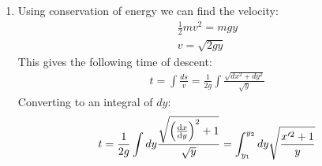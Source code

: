 \documentclass[12pt]{article}
\title{}
\author{Johannes Byle}
\begin{document}
    \maketitle
    \begin{enumerate}
        \item Using conservation of energy we can find the velocity:
        \begin{gather*}
            \frac{1}{2}mv^2=mgy\\
            v=\sqrt{2gy}
        \end{gather*}
        This gives the following time of descent:
        \begin{gather*}
            t=\int \frac{ds}{v}=\frac{1}{2g}\int \frac{\sqrt{dx^2+dy^2}}{\sqrt{y}}
        \end{gather*}
        Converting to an integral of $dy$:
        \begin{gather*}
            t=\frac{1}{2g}\int dy\frac{\sqrt{\left(\dv{x}{y}\right)^2+1}}{\sqrt{y}}=\int_{y_1}^{y_2}dy\sqrt{\frac{x'^2+1}{y}}
        \end{gather*}
    \end{enumerate}
\end{document}
